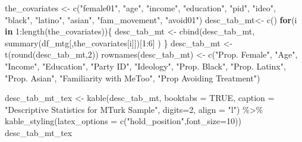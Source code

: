 \documentclass[
]{article}
\newenvironment{Shaded}{\begin{snugshade}}{\end{snugshade}}
\newcommand{\AttributeTok}[1]{\textcolor[rgb]{0.77,0.63,0.00}{#1}}
\newcommand{\ConstantTok}[1]{\textcolor[rgb]{0.00,0.00,0.00}{#1}}
\newcommand{\ControlFlowTok}[1]{\textcolor[rgb]{0.13,0.29,0.53}{\textbf{#1}}}
\newcommand{\DecValTok}[1]{\textcolor[rgb]{0.00,0.00,0.81}{#1}}
\newcommand{\FunctionTok}[1]{\textcolor[rgb]{0.00,0.00,0.00}{#1}}
\newcommand{\NormalTok}[1]{#1}
\newcommand{\OtherTok}[1]{\textcolor[rgb]{0.56,0.35,0.01}{#1}}
\newcommand{\SpecialCharTok}[1]{\textcolor[rgb]{0.00,0.00,0.00}{#1}}
\newcommand{\StringTok}[1]{\textcolor[rgb]{0.31,0.60,0.02}{#1}}
\begin{document}
\begin{Shaded}
\begin{Highlighting}[]
\NormalTok{the\_covariates }\OtherTok{\textless{}{-}} \FunctionTok{c}\NormalTok{(}\StringTok{"female01"}\NormalTok{, }\StringTok{"age"}\NormalTok{, }\StringTok{"income"}\NormalTok{, }\StringTok{"education"}\NormalTok{, }\StringTok{"pid"}\NormalTok{, }\StringTok{"ideo"}\NormalTok{, }
                    \StringTok{"black"}\NormalTok{, }\StringTok{"latino"}\NormalTok{, }\StringTok{"asian"}\NormalTok{, }\StringTok{"fam\_movement"}\NormalTok{, }\StringTok{"avoid01"}\NormalTok{)}
\NormalTok{desc\_tab\_mt}\OtherTok{\textless{}{-}} \FunctionTok{c}\NormalTok{()}
\ControlFlowTok{for}\NormalTok{(i }\ControlFlowTok{in} \DecValTok{1}\SpecialCharTok{:}\FunctionTok{length}\NormalTok{(the\_covariates))\{}
\NormalTok{  desc\_tab\_mt }\OtherTok{\textless{}{-}} \FunctionTok{cbind}\NormalTok{(desc\_tab\_mt,}
                       \FunctionTok{summary}\NormalTok{(df\_mtg[,the\_covariates[i]])[}\DecValTok{1}\SpecialCharTok{:}\DecValTok{6}\NormalTok{]}
\NormalTok{                       )}
\NormalTok{\}}
\NormalTok{desc\_tab\_mt }\OtherTok{\textless{}{-}} \FunctionTok{t}\NormalTok{(}\FunctionTok{round}\NormalTok{(desc\_tab\_mt,}\DecValTok{2}\NormalTok{))}
\FunctionTok{rownames}\NormalTok{(desc\_tab\_mt) }\OtherTok{\textless{}{-}} \FunctionTok{c}\NormalTok{(}\StringTok{"Prop. Female"}\NormalTok{, }\StringTok{"Age"}\NormalTok{, }\StringTok{"Income"}\NormalTok{, }\StringTok{"Education"}\NormalTok{,}
                           \StringTok{"Party ID"}\NormalTok{, }\StringTok{"Ideology"}\NormalTok{,}
                           \StringTok{"Prop. Black"}\NormalTok{,}
                           \StringTok{"Prop. Latinx"}\NormalTok{,}
                           \StringTok{"Prop. Asian"}\NormalTok{,}
                           \StringTok{"Familiarity with MeToo"}\NormalTok{,}
                           \StringTok{"Prop Avoiding Treatment"}\NormalTok{)}


\NormalTok{desc\_tab\_mt\_tex }\OtherTok{\textless{}{-}} \FunctionTok{kable}\NormalTok{(desc\_tab\_mt,}
      \AttributeTok{booktabs =} \ConstantTok{TRUE}\NormalTok{, }
               \AttributeTok{caption =} \StringTok{"Descriptive Statistics for MTurk Sample"}\NormalTok{, }
               \AttributeTok{digits=}\DecValTok{2}\NormalTok{,}
  \AttributeTok{align =} \StringTok{"l"}\NormalTok{) }\SpecialCharTok{\%\textgreater{}\%} 
  \FunctionTok{kable\_styling}\NormalTok{(}\AttributeTok{latex\_options =} \FunctionTok{c}\NormalTok{(}\StringTok{"hold\_position"}\NormalTok{,}\AttributeTok{font\_size=}\DecValTok{10}\NormalTok{))}
\NormalTok{desc\_tab\_mt\_tex}
\end{Highlighting}
\end{Shaded}
\end{document}
